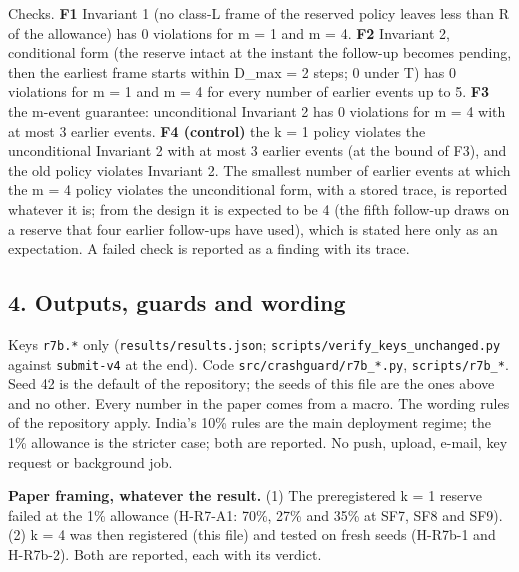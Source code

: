 Checks. \textbf{F1} Invariant 1 (no class-L frame of the reserved policy leaves less than R of the allowance) has 0 violations for m = 1 and m = 4. \textbf{F2} Invariant 2, conditional form (the reserve intact at the instant the follow-up becomes pending, then the earliest frame starts within D\_max = 2 steps; 0 under T) has 0 violations for m = 1 and m = 4 for every number of earlier events up to 5. \textbf{F3} the m-event guarantee: unconditional Invariant 2 has 0 violations for m = 4 with at most 3 earlier events. \textbf{F4 (control)} the k = 1 policy violates the unconditional Invariant 2 with at most 3 earlier events (at the bound of F3), and the old policy violates Invariant 2. The smallest number of earlier events at which the m = 4 policy violates the unconditional form, with a stored trace, is reported whatever it is; from the design it is expected to be 4 (the fifth follow-up draws on a reserve that four earlier follow-ups have used), which is stated here only as an expectation. A failed check is reported as a finding with its trace.

\subsection*{4. Outputs, guards and wording}

Keys \texttt{r7b.*} only (\texttt{results/results.json}; \texttt{scripts/verify\_keys\_unchanged.py} against \texttt{submit-v4} at the end). Code \texttt{src/crashguard/r7b\_*.py}, \texttt{scripts/r7b\_*}. Seed 42 is the default of the repository; the seeds of this file are the ones above and no other. Every number in the paper comes from a macro. The wording rules of the repository apply. India's 10\% rules are the main deployment regime; the 1\% allowance is the stricter case; both are reported. No push, upload, e-mail, key request or background job.

\textbf{Paper framing, whatever the result.} (1) The preregistered k = 1 reserve failed at the 1\% allowance (H-R7-A1: 70\%, 27\% and 35\% at SF7, SF8 and SF9). (2) k = 4 was then registered (this file) and tested on fresh seeds (H-R7b-1 and H-R7b-2). Both are reported, each with its verdict.

